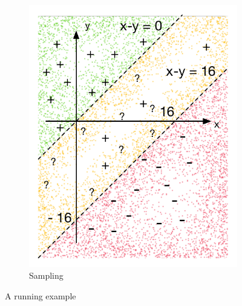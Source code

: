 \begin{figure}[t]
\begin{subfigure}{.5\textwidth}
      \includegraphics[scale=0.42]{figures/running-sampling.pdf}
      \caption{Sampling}
      \label{fig:running:example:sampling}
\end{subfigure}
\caption{A running example}
\label{fig:running:example}
\end{figure}

